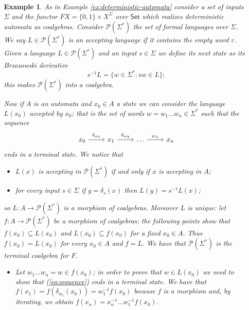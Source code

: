 \documentclass[letterpaper, 11pt, oneside]{memoir}
\theoremstyle{myteo}
\newtheorem{example}[theorem]{Example}
\numberwithin{equation}{section}
\newcommand{\Set}{\textsf{Set}}
\begin{document}
\begin{example}
  As in Example \ref{ex:deterministic-automata} consider a set of inputs \(\Sigma\) and the functor \(FX = \{0, 1\} \times X^\Sigma\) over \(\Set\) which realizes deterministic automata as coalgebras.
  Consider \(\mathcal{P}(\Sigma^*)\) the set of formal languages over \(\Sigma\).
  We say \(L\in \mathcal{P}(\Sigma^*)\) is an accepting language if it contains the empty word \(\varepsilon\).
  Given a language \(L \in \mathcal{P}(\Sigma^*)\) and an input \(s \in \Sigma\) we define its next state as its Brzozowski derivative
  \begin{equation*}
    s^{-1}L = \{w \in \Sigma^* : sw \in L\};
  \end{equation*}
  this makes \(\mathcal{P}(\Sigma^*)\) into a coalgebra.

  Now if \(A\) is an automata and \(x_0 \in A\) a state we can consider the language \(L(x_0)\) accepted by \(x_0\); that is the set of words \(w = w_1\ldots w_n \in \Sigma^*\) such that the sequence
  \begin{equation}
    \label{eq:sequence}
    \begin{tikzcd}[sep=normal]
      x_0 \ar[r, "\delta_{w_1}"] & x_1 \ar[r, "\delta_{w_2}"] & \ldots \ar[r, "w_{n}"] & x_n
    \end{tikzcd}
  \end{equation}
  ends in a terminal state.
  We notice that
  \begin{itemize}
  \item[1.] \(L(x)\) is accepting in \(\mathcal{P}(\Sigma^*)\) if and only if \(x\) is accepting in \(A\);
  \item[2.] for every input \(s \in \Sigma\) if \(y = \delta_s(x)\) then \(L(y) = s^{-1}L(x)\);
  \end{itemize}
  so \(L: A \to \mathcal{P}(\Sigma^*)\) is a morphism of coalgebras. Moreover \(L\) is unique: let \(f: A \to \mathcal{P}(\Sigma^*)\) be a morphism of coalgebras; the following points show that \(f(x_0) \subseteq L(x_0)\) and \(L(x_0) \subseteq f(x_0)\) for a fixed \(x_0 \in A\). Thus \(f(x_0) = L(x_0)\) for every \(x_0 \in A\) and \(f = L\).
  We have that \(\mathcal{P}(\Sigma^*)\) is the terminal coalgebra for \(F\).
  \begin{itemize}
  \item[a.] Let \(w_1\ldots w_n = w \in f(x_0)\); in order to prove that \(w \in L(x_0)\) we need to show that (\ref{eq:sequence}) ends in a terminal state.
    We have that \(f(x_1) = f(\delta_{w_1}(x_0)) = w_1^{-1}f(x_0)\) because \(f\) is a morphism and, by iterating, we obtain \(f(x_n) = x_n^{-1}\ldots w_1^{-1}f(x_0)\).

\end{itemize}
\end{example}
\end{document}
